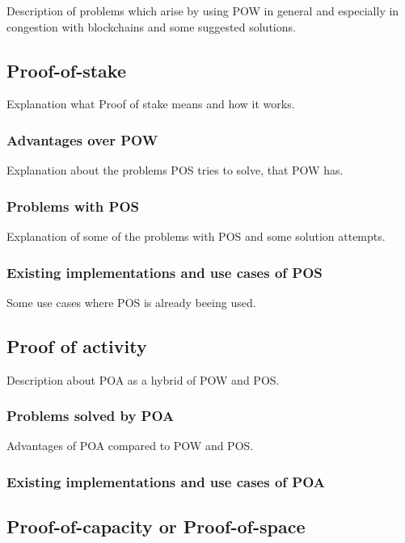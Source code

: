 \documentclass{acm_proc_article-sp}
\begin{document}
Description of problems which arise by using POW in general and especially in congestion with blockchains and some suggested solutions.


\subsection{Proof-of-stake}

Explanation what Proof of stake means and how it works.


\subsubsection{Advantages over POW}

Explanation about the problems POS tries to solve, that POW has.


\subsubsection{Problems with POS}

Explanation of some of the problems with POS and some solution attempts.


\subsubsection{Existing implementations and use cases of POS}

Some use cases where POS is already beeing used.


\subsection{Proof of activity}

Description about POA as a hybrid of POW and POS.


\subsubsection{Problems solved by POA}

Advantages of POA compared to POW and POS.


\subsubsection{Existing implementations and use cases of POA}


\subsection{Proof-of-capacity or Proof-of-space}
\end{document}
